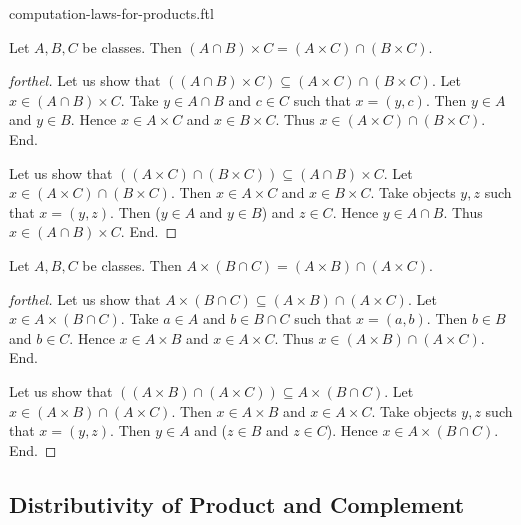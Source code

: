 \documentclass{naproche-library}
\begin{document}
\begin{smodule}{computation-laws-for-products.ftl}
  \begin{proposition}[forthel,id=FOUNDATIONS_05_1249567930580992]
    Let $A, B, C$ be classes.
    Then $(A \cap B) \times C = (A \times C) \cap (B \times C)$.
  \end{proposition}
  \begin{proof}[forthel]
    Let us show that $((A \cap B) \times C) \subseteq (A \times C) \cap (B \times C)$. %
      Let $x \in (A \cap B) \times C$.
      Take $y \in A \cap B$ and $c \in C$ such that $x = (y, c)$.
      Then $y \in A$ and $y \in B$.
      Hence $x \in A \times C$ and $x \in B \times C$.
      Thus $x \in (A \times C) \cap (B \times C)$.
    End.

    Let us show that $((A \times C) \cap (B \times C)) \subseteq (A \cap B) \times C$. %
      Let $x \in (A \times C) \cap (B \times C)$.
      Then $x \in A \times C$ and $x \in B \times C$.
      Take objects $y, z$ such that $x = (y, z)$.
      Then ($y \in A$ and $y \in B$) and $z \in C$.
      Hence $y \in A \cap B$.
      Thus $x \in (A \cap B) \times C$.
    End.
  \end{proof}

  \begin{proposition}[forthel,id=FOUNDATIONS_05_954964241285120]
    Let $A, B, C$ be classes.
    Then $A \times (B \cap C) = (A \times B) \cap (A \times C)$.
  \end{proposition}
  \begin{proof}[forthel]
    Let us show that $A \times (B \cap C) \subseteq (A \times B) \cap (A \times C)$.
      Let $x \in A \times (B \cap C)$.
      Take $a \in A$ and $b \in B \cap C$ such that $x = (a, b)$.
      Then $b \in B$ and $b \in C$.
      Hence $x \in A \times B$ and $x \in A \times C$.
      Thus $x \in (A \times B) \cap (A \times C)$.
    End.

    Let us show that $((A \times B) \cap (A \times C)) \subseteq A \times (B \cap C)$. %
      Let $x \in (A \times B) \cap (A \times C)$.
      Then $x \in A \times B$ and $x \in A \times C$.
      Take objects $y, z$ such that $x = (y, z)$.
      Then $y \in A$ and ($z \in B$ and $z \in C$).
      Hence $x \in A \times (B \cap C)$.
    End.
  \end{proof}


  \subsection*{Distributivity of Product and Complement}


\end{smodule}
\end{document}
